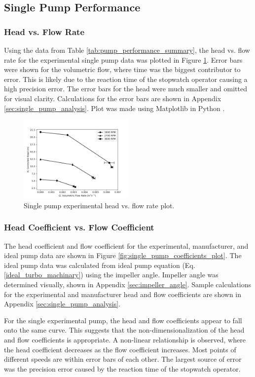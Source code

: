 \subsection{Single Pump Performance}
\subsubsection{Head vs. Flow Rate}
Using the data from Table \ref{tab:pump_performance_summary}, the head vs. flow rate for the experimental single pump data was plotted in Figure \ref{fig:single_pump_plot}. Error bars were shown for the volumetric flow, where time was the biggest contributor to error. This is likely due to the reaction time of the stopwatch operator causing a high precision error. The error bars for the head were much smaller and omitted for visual clarity. Calculations for the error bars are shown in Appendix \ref{sec:single_pump_analysis}. Plot was made using Matplotlib in Python \cite{Matplotlib}.
\begin{figure}[H]
    \centering
    \includegraphics[width=0.5\textwidth]{Sections/Figures/Single Pump Plot.png}
    \caption{Single pump experimental head vs. flow rate plot.}
    \label{fig:single_pump_plot}
\end{figure}

\subsubsection{Head Coefficient vs. Flow Coefficient}
The head coefficient and flow coefficient for the experimental, manufacturer, and ideal pump data are shown in Figure \ref{fig:single_pump_coefficients_plot}. The ideal pump data was calculated from ideal pump equation (Eq. \ref{ideal_turbo_machinary}) using the impeller angle. Impeller angle was determined visually, shown in Appendix \ref{sec:impeller_angle}. Sample calculations for the experimental and manufacturer head and flow coefficients are shown in Appendix \ref{sec:single_pump_analysis}.

For the single experimental pump, the head and flow coefficients appear to fall onto the same curve. This suggests that the non-dimensionalization of the 
head and flow coefficients is appropriate. A non-linear relationship is observed, where the head coefficient decreases as the flow coefficient increases. Most points of different speeds are within error bars of each other.  The largest source of error was the precision error caused by the reaction time of the stopwatch operator.

